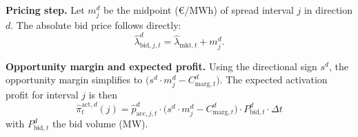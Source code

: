 \textbf{Pricing step.}
Let $m_{j}^{d}$ be the midpoint (€/MWh) of spread interval $j$ in direction $d$. The absolute bid price follows directly:
\[
    \hat{\lambda}_{\text{bid}, j, t}^{d} = \hat{\lambda}_{\text{mkt}, t} + m_{j}^{d}.
\]

\textbf{Opportunity margin and expected profit.}
Using the directional sign $s^{d}$, the opportunity margin simplifies to $\big(s^{d}\cdot m_{j}^{d} - C_{\text{marg}, t}^{d}\big)$. The expected activation profit for interval $j$ is then
\begin{equation}\label{eq:pi-act-prob}
    \hat{\pi}_{t}^{\text{act},d}(j) = \hat{p}_{\text{acc}, j, t}^{d} \cdot \Big( s^{d} \cdot m_{j}^{d} - C_{\text{marg}, t}^{d} \Big) \cdot P_{\text{bid}, t}^{d} \cdot \Delta t
\end{equation}
with $P_{\text{bid}, t}^{d}$ the bid volume (MW).




